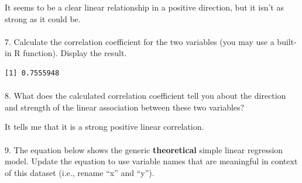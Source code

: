 \documentclass[
  letterpaper,
  DIV=11,
  numbers=noendperiod]{scrartcl}
\makeatletter
\let\oldparagraph\paragraph
\renewcommand{\paragraph}{
    \@ifstar
      \xxxParagraphStar
      \xxxParagraphNoStar
  }
\newcommand{\xxxParagraphStar}[1]{\oldparagraph*{#1}\mbox{}}
\newcommand{\xxxParagraphNoStar}[1]{\oldparagraph{#1}\mbox{}}
\newenvironment{Shaded}{\begin{snugshade}}{\end{snugshade}}
\newcommand{\FunctionTok}[1]{\textcolor[rgb]{0.28,0.35,0.67}{#1}}
\newcommand{\NormalTok}[1]{\textcolor[rgb]{0.00,0.23,0.31}{#1}}
\newcommand{\SpecialCharTok}[1]{\textcolor[rgb]{0.37,0.37,0.37}{#1}}
\makeatother
\begin{document}
It seems to be a clear linear relationship in a positive direction, but
it isn't as strong as it could be.

\paragraph{7. Calculate the correlation coefficient for the two
variables (you may use a built-in R function). Display the
result.}\label{calculate-the-correlation-coefficient-for-the-two-variables-you-may-use-a-built-in-r-function.-display-the-result.}

\begin{Shaded}
\end{Shaded}

\begin{verbatim}
[1] 0.7555948
\end{verbatim}

\paragraph{8. What does the calculated correlation coefficient tell you
about the direction and strength of the linear association between these
two
variables?}\label{what-does-the-calculated-correlation-coefficient-tell-you-about-the-direction-and-strength-of-the-linear-association-between-these-two-variables}

It tells me that it is a strong positive linear correlation.

\paragraph{\texorpdfstring{9. The equation below shows the generic
\textbf{theoretical} simple linear regression model. Update the equation
to use variable names that are meaningful in context of this dataset
(i.e., rename ``x'' and
``y'').}{9. The equation below shows the generic theoretical simple linear regression model. Update the equation to use variable names that are meaningful in context of this dataset (i.e., rename ``x'' and ``y'').}}\label{the-equation-below-shows-the-generic-theoretical-simple-linear-regression-model.-update-the-equation-to-use-variable-names-that-are-meaningful-in-context-of-this-dataset-i.e.-rename-x-and-y.}
\end{document}
